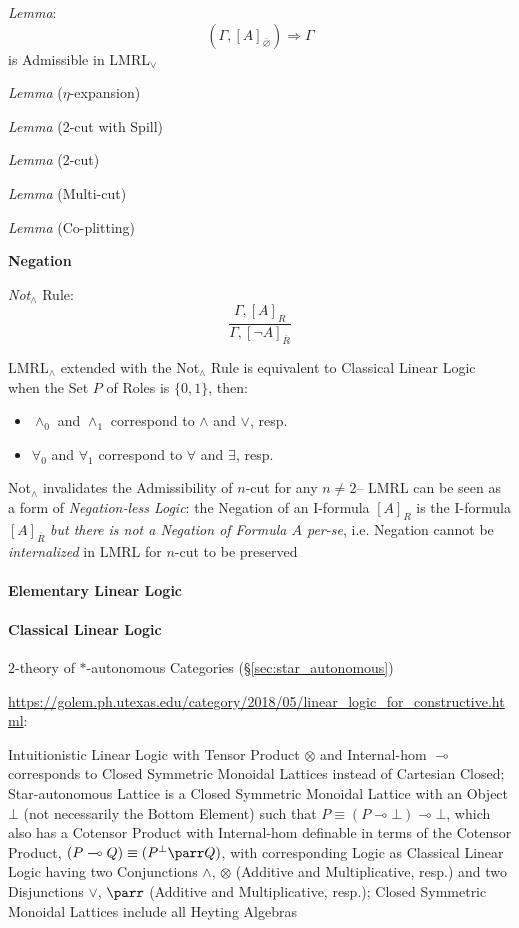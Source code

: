 \emph{Lemma}:
\[
  (\Gamma, [A]_{\overline{\varnothing}}) \Rightarrow \Gamma
\]
is Admissible in LMRL$_\vee$

\emph{Lemma} ($\eta$-expansion)

\emph{Lemma} (2-cut with Spill)

\emph{Lemma} (2-cut)

\emph{Lemma} (Multi-cut)

\emph{Lemma} (Co-plitting)



\textbf{Negation}

\emph{Not$_\wedge$} Rule:
\[
  \frac{
    \Gamma, [A]_R
  }{
    \Gamma, [\neg A]_{\overline{R}}
  }
\]

LMRL$_\wedge$ extended with the Not$_\wedge$ Rule is equivalent to
Classical Linear Logic when the Set $P$ of Roles is $\{0,1\}$, then:
\begin{itemize}
  \item $\wedge_0$ and $\wedge_1$ correspond to $\wedge$ and $\vee$,
    resp.
  \item $\forall_0$ and $\forall_1$ correspond to $\forall$ and
    $\exists$, resp.
\end{itemize}

Not$_\wedge$ invalidates the Admissibility of $n$-cut for any $n \neq
2$-- LMRL can be seen as a form of \emph{Negation-less Logic}: the
Negation of an I-formula $[A]_R$ is the I-formula $[A]_{\overline{R}}$
\emph{but there is not a Negation of Formula $A$ per-se}, i.e.
Negation cannot be \emph{internalized} in LMRL for $n$-cut to be
preserved


\endgroup



\paragraph{Elementary Linear Logic}\label{sec:elementary_linear_logic}\hfill

\paragraph{Classical Linear Logic}\label{sec:classical_linear_logic}\hfill

$2$-theory of $*$-autonomous Categories (\S\ref{sec:star_autonomous})

\url{https://golem.ph.utexas.edu/category/2018/05/linear_logic_for_constructive.html}:

Intuitionistic Linear Logic with Tensor Product $\otimes$ and Internal-hom
$\multimap$ corresponds to Closed Symmetric Monoidal Lattices instead of
Cartesian Closed; Star-autonomous Lattice is a Closed Symmetric Monoidal
Lattice with an Object $\bot$ (not necessarily the Bottom Element) such that $P
\equiv (P \multimap \bot) \multimap \bot$, which also has a Cotensor Product
with Internal-hom definable in terms of the Cotensor Product, $(P \multimap Q)
\equiv (P^\bot \parr Q)$, with corresponding Logic as Classical Linear Logic
having two Conjunctions $\wedge$, $\otimes$ (Additive and Multiplicative,
resp.) and two Disjunctions $\vee$, $\parr$ (Additive and Multiplicative,
resp.); Closed Symmetric Monoidal Lattices include all Heyting Algebras

